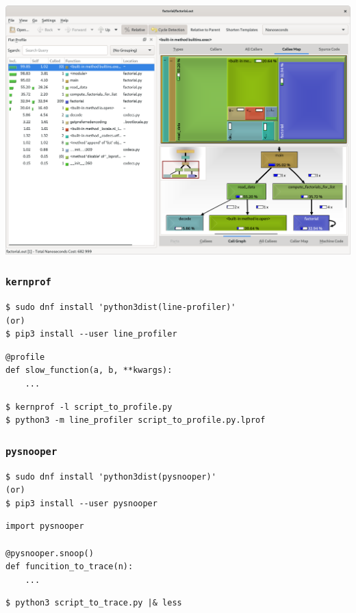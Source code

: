 \documentclass[serif]{beamer}
\begin{document}
\begin{frame}
  \includegraphics[width=\textwidth]{factorial/kcachegrind.png}
\end{frame}

\begin{frame}[fragile]
  \frametitle{\texttt{kernprof}}

  \begin{verbatim}
$ sudo dnf install 'python3dist(line-profiler)'
(or)
$ pip3 install --user line_profiler
\end{verbatim}

  \bigskip

  \begin{verbatim}
@profile
def slow_function(a, b, **kwargs):
    ...
  \end{verbatim}

  \bigskip

  \begin{verbatim}
$ kernprof -l script_to_profile.py
$ python3 -m line_profiler script_to_profile.py.lprof
\end{verbatim}

\end{frame}

\begin{frame}[fragile]
  \frametitle{\texttt{pysnooper}}

  \begin{verbatim}
$ sudo dnf install 'python3dist(pysnooper)'
(or)
$ pip3 install --user pysnooper
\end{verbatim}

  \bigskip

  \begin{verbatim}
import pysnooper

@pysnooper.snoop()
def funcition_to_trace(n):
    ...
\end{verbatim}

  \bigskip

\begin{verbatim}
$ python3 script_to_trace.py |& less
\end{verbatim}

\end{frame}
\end{document}
